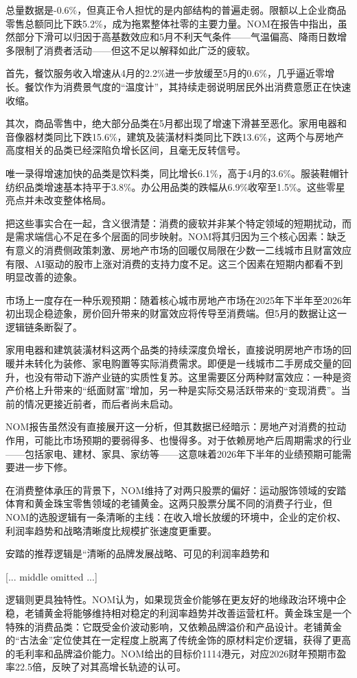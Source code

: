 \documentclass[11pt]{ctexart}
\begin{document}
总量数据是-0.6\%，但真正令人担忧的是内部结构的普遍走弱。限额以上企业商品零售总额同比下跌5.2\%，成为拖累整体社零的主要力量。NOM在报告中指出，虽然部分下滑可以归因于高基数效应和5月不利天气条件——气温偏高、降雨日数增多限制了消费者活动——但这不足以解释如此广泛的疲软。

首先，餐饮服务收入增速从4月的2.2\%进一步放缓至5月的0.6\%，几乎逼近零增长。餐饮作为消费景气度的“温度计”，其持续走弱说明居民外出消费意愿正在快速收缩。

其次，商品零售中，绝大部分品类在5月都出现了增速下滑甚至恶化。家用电器和音像器材类同比下跌15.6\%，建筑及装潢材料类同比下跌13.6\%，这两个与房地产高度相关的品类已经深陷负增长区间，且毫无反转信号。

唯一录得增速加快的品类是饮料类，同比增长6.1\%，高于4月的3.6\%。服装鞋帽针纺织品类增速基本持平于3.8\%。办公用品类的跌幅从6.9\%收窄至1.5\%。这些零星亮点并未改变整体格局。

把这些事实合在一起，含义很清楚：消费的疲软并非某个特定领域的短期扰动，而是需求端信心不足在多个层面的同步映射。NOM将其归因为三个核心因素：缺乏有意义的消费侧政策刺激、房地产市场的回暖仅局限在少数一二线城市且财富效应有限、AI驱动的股市上涨对消费的支持力度不足。这三个因素在短期内都看不到明显改善的迹象。

市场上一度存在一种乐观预期：随着核心城市房地产市场在2025年下半年至2026年初出现企稳迹象，房价回升带来的财富效应将传导至消费端。但5月的数据让这一逻辑链条断裂了。

家用电器和建筑装潢材料这两个品类的持续深度负增长，直接说明房地产市场的回暖并未转化为装修、家电购置等实际消费需求。即便是一线城市二手房成交量的回升，也没有带动下游产业链的实质性复苏。这里需要区分两种财富效应：一种是资产价格上升带来的“纸面财富”增加，另一种是实际交易活跃带来的“变现消费”。当前的情况更接近前者，而后者尚未启动。

NOM报告虽然没有直接展开这一分析，但其数据已经暗示：房地产对消费的拉动作用，可能比市场预期的要弱得多、也慢得多。对于依赖房地产后周期需求的行业——包括家电、建材、家具、家纺等——这意味着2026年下半年的业绩预期可能需要进一步下修。

在消费整体承压的背景下，NOM维持了对两只股票的偏好：运动服饰领域的安踏体育和黄金珠宝零售领域的老铺黄金。这两只股票分属不同的消费子行业，但NOM的选股逻辑有一条清晰的主线：在收入增长放缓的环境中，企业的定价权、利润率趋势和战略清晰度比规模扩张速度更重要。

安踏的推荐逻辑是“清晰的品牌发展战略、可见的利润率趋势和

[... middle omitted ...]

逻辑则更具独特性。NOM认为，如果现货金价能够在更友好的地缘政治环境中企稳，老铺黄金将能够维持相对稳定的利润率趋势并改善运营杠杆。黄金珠宝是一个特殊的消费品类：它既受金价波动影响，又依赖品牌溢价和产品设计。老铺黄金的“古法金”定位使其在一定程度上脱离了传统金饰的原材料定价逻辑，获得了更高的毛利率和品牌溢价能力。NOM给出的目标价1114港元，对应2026财年预期市盈率22.5倍，反映了对其高增长轨迹的认可。
\end{document}
